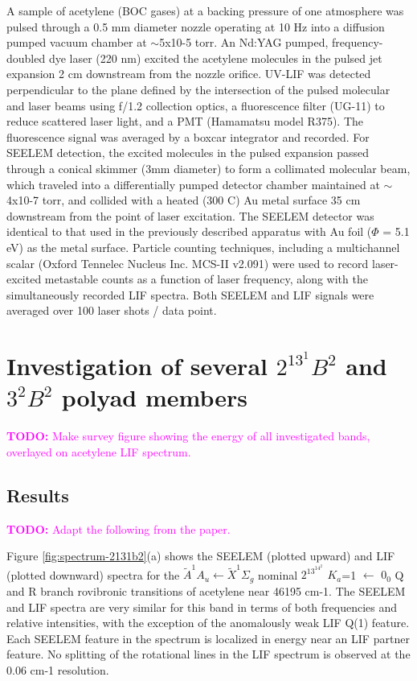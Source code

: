 \documentclass[12pt,draft]{mitthesis}
\newcommand{\TODO} [1]{\textcolor{magenta}{\textbf{TODO:} #1}}
\begin{document}
A sample of acetylene (BOC gases) at a backing pressure of one
atmosphere was pulsed through a 0.5 mm diameter nozzle operating at 10
Hz into a diffusion pumped vacuum chamber at $\sim$5x10-5 torr.  An Nd:YAG
pumped, frequency-doubled dye laser (220 nm) excited the acetylene
molecules in the pulsed jet expansion 2 cm downstream from the nozzle
orifice. UV-LIF was detected perpendicular to the plane defined by the
intersection of the pulsed molecular and laser beams using f/1.2
collection optics, a fluorescence filter (UG-11) to reduce scattered
laser light, and a PMT (Hamamatsu model R375). The fluorescence signal
was averaged by a boxcar integrator and recorded. For SEELEM
detection, the excited molecules in the pulsed expansion passed
through a conical skimmer (3mm diameter) to form a collimated
molecular beam, which traveled into a differentially pumped detector
chamber maintained at $\sim$4x10-7 torr, and collided with a heated (300
C) Au metal surface 35 cm downstream from the point of laser
excitation. The SEELEM detector was identical to that used in the
previously described apparatus with Au foil ($\Phi$ = 5.1 eV) as the
metal surface.  Particle counting techniques, including a multichannel
scalar (Oxford Tennelec Nucleus Inc. MCS-II v2.091) were used to
record laser-excited metastable counts as a function of laser
frequency, along with the simultaneously recorded LIF spectra. Both
SEELEM and LIF signals were averaged over 100 laser shots / data
point.


\section{Investigation of several $2^13^1B^2$ and $3^2B^2$ polyad
  members}

\TODO{Make survey figure showing the energy of all investigated bands,
  overlayed on acetylene LIF spectrum.}

\subsection{Results}

\TODO{Adapt the following from the paper.}

Figure \ref{fig:spectrum-2131b2}(a) shows the SEELEM (plotted upward)
and LIF (plotted downward) spectra for the $\tilde{A}^1A_u \leftarrow
\tilde{X}^1\Sigma_g$ nominal $2^13^14^2$ $K_a$=1 $\leftarrow$ $0_0$ Q
and R branch rovibronic transitions of acetylene near 46195 cm-1. The
SEELEM and LIF spectra are very similar for this band in terms of both
frequencies and relative intensities, with the exception of the
anomalously weak LIF Q(1) feature. Each SEELEM feature in the spectrum
is localized in energy near an LIF partner feature. No splitting of
the rotational lines in the LIF spectrum is observed at the 0.06 cm-1
resolution.
\end{document}
